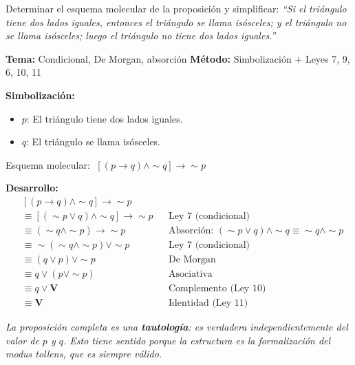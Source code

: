 \begin{tcolorbox}[
  enhanced, breakable,
  colback=GrisClaro, colframe=AzulPizarra,
  fonttitle=\bfseries\sffamily,
  title={Ejercicio 4 --- Nivel Avanzado (UNMSM)},
  arc=3pt, boxrule=0.8pt
]
\begin{problema}
  Determinar el esquema molecular de la proposición y simplificar:
  \textit{``Si el triángulo tiene dos lados iguales, entonces el triángulo
  se llama isósceles; y el triángulo no se llama isósceles; luego el
  triángulo no tiene dos lados iguales.''}
\end{problema}

\smallskip
\noindent
\textbf{\sffamily\color{AzulMedio}Tema:} Condicional, De Morgan, absorción
\hfill
\textbf{\sffamily\color{AzulMedio}M\'{e}todo:} Simbolización + Leyes 7, 9, 6, 10, 11

\medskip
\noindent\textbf{\sffamily Simbolización:}
\begin{itemize}
  \item $p$: El triángulo tiene dos lados iguales.
  \item $q$: El triángulo se llama isósceles.
\end{itemize}

\noindent Esquema molecular:
$\;[(p \rightarrow q) \wedge \sim q] \rightarrow \sim p$

\medskip
\noindent\textbf{\sffamily Desarrollo:}
\begin{align*}
  &[(p \rightarrow q) \wedge \sim q] \rightarrow \sim p \\[6pt]
  &\equiv [(\sim p \vee q) \wedge \sim q] \rightarrow \sim p
  && \text{Ley 7 (condicional)} \\[6pt]
  &\equiv (\sim q \wedge \sim p) \rightarrow \sim p
  && \text{Absorci\'{o}n: } (\sim p \vee q) \wedge \sim q
     \equiv \sim q \wedge \sim p \\[6pt]
  &\equiv \sim(\sim q \wedge \sim p) \vee \sim p
  && \text{Ley 7 (condicional)} \\[6pt]
  &\equiv (q \vee p) \vee \sim p
  && \text{De Morgan} \\[6pt]
  &\equiv q \vee (p \vee \sim p)
  && \text{Asociativa} \\[6pt]
  &\equiv q \vee \mathbf{V}
  && \text{Complemento (Ley 10)} \\[6pt]
  &\equiv \mathbf{V}
  && \text{Identidad (Ley 11)}
\end{align*}

\noindent\textit{La proposición completa es una \textbf{tautología}: es
verdadera independientemente del valor de $p$ y $q$. Esto tiene sentido
porque la estructura es la formalización del modus tollens, que es
siempre válido.}


\end{tcolorbox}
